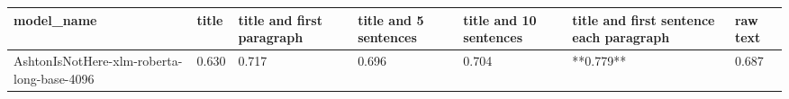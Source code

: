\begin{tabular}{lllllll}
\toprule
                                model\_name & title & title and first paragraph & title and 5 sentences & title and 10 sentences & title and first sentence each paragraph & raw text \\
\midrule
AshtonIsNotHere-xlm-roberta-long-base-4096 & 0.630 &                     0.717 &                 0.696 &                  0.704 &                               **0.779** &    0.687 \\
\bottomrule
\end{tabular}
